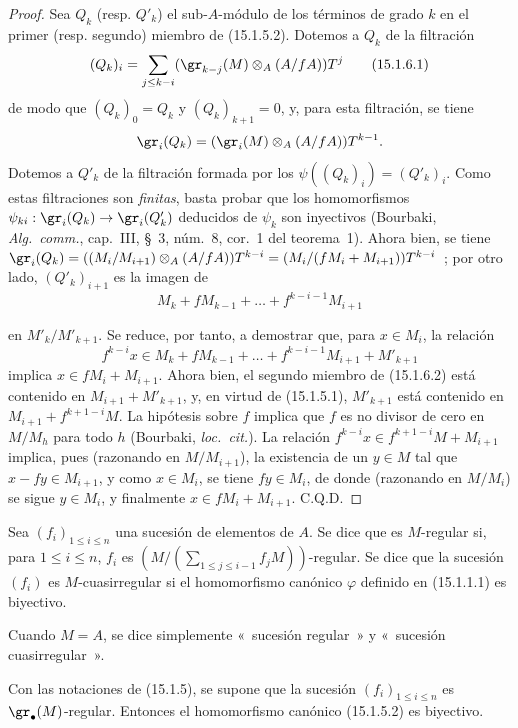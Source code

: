 \begin{proof}
Sea $Q_k$ (resp. $Q'_k$) el sub-$A$-módulo de los términos de grado $k$ en
el primer (resp. segundo) miembro de (15.1.5.2). Dotemos a $Q_k$ de la filtración
\[
  (Q_k)_i=\sum_{j\leq k-i}
  (\gr_{k-j}(M)\otimes_A(A/fA))T^j
  \tag{15.1.6.1}\label{0.15.1.6.1-fr}
\]
de modo que $(Q_k)_0=Q_k$ y $(Q_k)_{k+1}=0$, y, para esta filtración, se tiene
\[
  \gr_i(Q_k)=(\gr_i(M)\otimes_A(A/fA))T^{k-1}.
\]
Dotemos a $Q'_k$ de la filtración formada por los
$\psi((Q_k)_i)=(Q'_k)_i$. Como estas filtraciones son \emph{finitas}, basta
probar que los homomorfismos $\psi_{ki}:\gr_i(Q_k)\to\gr_i(Q'_k)$ deducidos de
$\psi_k$ son inyectivos (Bourbaki, \emph{Alg.~comm.}, cap.~III, \S~3,
núm.~8, cor.~1 del teorema~1). Ahora bien, se tiene
$\gr_i(Q_k)=((M_i/M_{i+1})\otimes_A(A/fA))T^{k-i}=(M_i/(fM_i+M_{i+1}))T^{k-i}$~;
por otro lado, $(Q'_k)_{i+1}$ es la imagen de
\[
  M_k+fM_{k-1}+\ldots+f^{k-i-1}M_{i+1}
\]

en $M'_k/M'_{k+1}$. Se reduce, por tanto, a demostrar que, para $x\in M_i$,
la relación
\[
  f^{k-i}x\in M_k+fM_{k-1}+\ldots+
  f^{k-i-1}M_{i+1}+M'_{k+1}
  \tag{15.1.6.2}\label{0.15.1.6.2-fr}
\]
implica $x\in fM_i+M_{i+1}$. Ahora bien, el segundo miembro de (15.1.6.2) está
contenido en $M_{i+1}+M'_{k+1}$, y, en virtud de (15.1.5.1), $M'_{k+1}$ está
contenido en $M_{i+1}+f^{k+1-i}M$. La hipótesis sobre $f$ implica que $f$ es
no divisor de cero en $M/M_h$ para todo $h$ (Bourbaki, \emph{loc.~cit.}). La
relación $f^{k-i}x\in f^{k+1-i}M+M_{i+1}$ implica, pues (razonando 
en
$M/M_{i+1}$), la existencia de un $y\in M$ tal que $x-fy\in M_{i+1}$, y como
$x\in M_i$, se tiene $fy\in M_i$, de donde (razonando en $M/M_i$) se sigue
$y\in M_i$, y finalmente $x\in fM_i+M_{i+1}$. C.Q.D.
\end{proof}

\begin{definition}[15.1.7]
\label{0.15.1.7-fr}
Sea $(f_i)_{1\leq i\leq n}$ una sucesión de elementos de $A$. Se dice que es
$M$-regular si, para $1\leq i\leq n$, $f_i$ es
$\left(M/(\sum_{1\leq j\leq i-1}f_jM)\right)$-regular. Se dice que la sucesión
$(f_i)$ es $M$-cuasirregular si el homomorfismo canónico $\varphi$
definido en (15.1.1.1) es biyectivo.

Cuando $M=A$, se dice simplemente «~sucesión regular~» y
«~sucesión cuasirregular~».
\end{definition}

\begin{proposition}[15.1.8]
\label{0.15.1.8-fr}
Con las notaciones de (15.1.5), se supone que la sucesión
$(f_i)_{1\leq i\leq n}$ es $\gr_\bullet(M)$-regular. Entonces
el homomorfismo canónico (15.1.5.2) es biyectivo.
\end{proposition}

